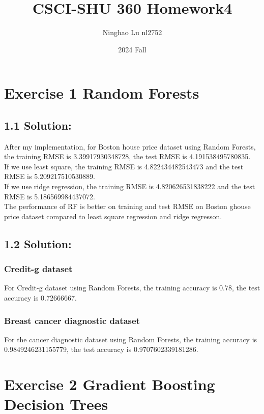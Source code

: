 \documentclass{article}
\title{CSCI-SHU 360 Homework4}
\author{Ninghao Lu nl2752}
\date{2024 Fall}
\begin{document}
\maketitle

\section*{Exercise 1 Random Forests}
\subsection*{1.1 Solution:}
After my implementation, for Boston house price dataset using Random Forests, the training RMSE is 3.39917930348728, the test RMSE is 4.191538495780835.\\
If we use least square, the training RMSE is 4.822434482543473 and the test RMSE is 5.209217510530889.\\
If we use ridge regression, the training RMSE is 4.820626531838222 and the test RMSE is 5.186569984437072.\\
The performance of RF is better on training and test RMSE on Boston ghouse price dataset compared to least square regression and ridge regresson.
\subsection*{1.2 Solution:}
\subsubsection*{Credit-g dataset}
For Credit-g dataset using Random Forests, the training accuracy is 0.78, the test accuracy is 0.72666667.

\subsubsection*{Breast cancer diagnostic dataset}
For the cancer diagnostic dataset using Random Forests, the training accuracy is 0.9849246231155779, the test accuracy is 0.9707602339181286.

\section*{Exercise 2 Gradient Boosting Decision Trees}
\end{document}
